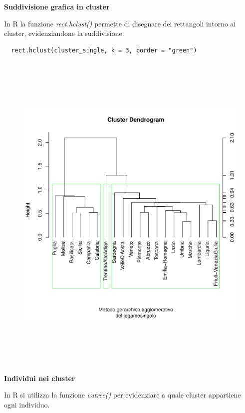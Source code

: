 \noindent \textbf{Suddivisione grafica in cluster}

In R la funzione \textit{rect.hclust()} permette di disegnare dei rettangoli intorno ai cluster, evidenziandone la suddivisione.

\vspace{5mm}
\begin{lstlisting}
  rect.hclust(cluster_single, k = 3, border = "green")
\end{lstlisting}
\vspace{5mm}

\vspace{5mm}
\begin{figure}[!htbp]
    \centering
    \includegraphics[height=16cm]{ProgettoSAD/capitoli/images/clustering/dendro_cl_sing_sudd.pdf}
\end{figure}
\vspace{5mm}

\noindent \textbf{Individui nei cluster}

In R si utilizza la funzione \textit{cutree()} per evidenziare a quale cluster appartiene ogni individuo.

